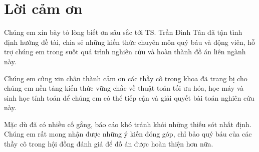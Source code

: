 \chapter*{Lời cảm ơn}
{}

Chúng em xin bày tỏ lòng biết ơn sâu sắc tới TS. Trần Đình Tân đã tận tình định hướng đề tài, chia sẻ những kiến thức chuyên môn quý báu và động viên, hỗ trợ chúng em trong suốt quá trình nghiên cứu và hoàn thành đồ án liên ngành này.

\medskip

Chúng em cũng xin chân thành cảm ơn các thầy cô trong khoa đã trang bị cho chúng em nền tảng kiến thức vững chắc về thuật toán tối ưu hóa, học máy và sinh học tính toán để chúng em có thể tiếp cận và giải quyết bài toán nghiên cứu này.

\medskip

Mặc dù đã có nhiều cố gắng, báo cáo khó tránh khỏi những thiếu sót nhất định. Chúng em rất mong nhận được những ý kiến đóng góp, chỉ bảo quý báu của các thầy cô trong hội đồng đánh giá để đồ án được hoàn thiện hơn nữa.

\clearpage

